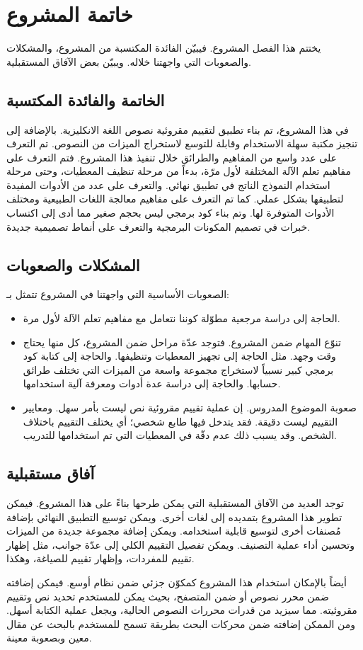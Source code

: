 

\chapter{خاتمة المشروع}
يختتم هذا الفصل المشروع.
فيبيّن الفائدة المكتسبة من المشروع، والمشكلات والصعوبات التي واجهتنا خلاله.
ويبيّن بعض الآفاق المستقبلية.

\section{الخاتمة والفائدة المكتسبة}
في هذا المشروع، تم بناء تطبيق لتقييم مقروئية نصوص اللغة الانكليزية.
بالإضافة إلى تنجيز مكتبة سهلة الاستخدام وقابلة للتوسع لاستخراج الميزات من النصوص.
تم التعرف على عدد واسع من المفاهيم والطرائق خلال تنفيذ هذا المشروع.
فتم التعرف على مفاهيم تعلم الآلة المختلفة لأول مرّة،
بدءاً من مرحلة تنظيف المعطيات، وحتى مرحلة استخدام النموذج الناتج في تطبيق نهائي.
والتعرف على عدد من الأدوات المفيدة لتطبيقها بشكل عملي.
كما تم التعرف على مفاهيم معالجة اللغات الطبيعية ومختلف الأدوات المتوفرة لها.
وتم بناء كود برمجي ليس بحجم صغير مما أدى إلى اكتساب خبرات في تصميم المكونات البرمجية والتعرف على أنماط تصميمية جديدة.



\section{المشكلات والصعوبات}
الصعوبات الأساسية التي واجهتنا في المشروع تتمثل بـ:
\begin{itemize}
	\item 
	الحاجة إلى دراسة مرجعية مطوّلة كوننا نتعامل مع مفاهيم تعلم الآلة لأول مرة.
	\item 
	تنوّع المهام ضمن المشروع.
	فتوجد عدّة مراحل ضمن المشروع، كل منها يحتاج وقت وجهد.
	مثل الحاجة إلى تجهيز المعطيات وتنظيفها.
	والحاجة إلى كتابة كود برمجي كبير نسبياً لاستخراج مجموعة واسعة من الميزات التي تختلف طرائق حسابها.
	والحاجة إلى دراسة عدة أدوات ومعرفة آلية استخدامها.
	\item
	صعوبة الموضوع المدروس.
	إن عملية تقييم مقروئية نص ليست بأمر سهل. ومعايير التقييم ليست دقيقة.
	فقد يتدخل فيها طابع شخصي؛ أي يختلف التقييم باختلاف الشخص.
	وقد يسبب ذلك عدم دقّة في المعطيات التي تم استخدامها للتدريب.
\end{itemize}


\section{آفاق مستقبلية}
توجد العديد من الآفاق المستقبلية التي يمكن طرحها بناءً على هذا المشروع.
فيمكن تطوير هذا المشروع بتمديده إلى لغات أخرى.
ويمكن توسيع التطبيق النهائي بإضافة مُصنفات أخرى لتوسيع قابلية استخدامه.
ويمكن إضافة مجموعة جديدة من الميزات وتحسين أداء عملية التصنيف.
ويمكن تفصيل التقييم الكلي إلى عدّة جوانب، مثل إظهار تقييم للمفردات، وإظهار تقييم للصياغة، وهكذا.

أيضاً بالإمكان استخدام هذا المشروع كمكوّن جزئي ضمن نظام أوسع.
فيمكن إضافته ضمن محرر نصوص أو ضمن المتصفح،
بحيث يمكن للمستخدم تحديد نص وتقييم مقروئيته.
مما سيزيد من قدرات محررات النصوص الحالية، ويجعل عملية الكتابة أسهل.
ومن الممكن إضافته ضمن محركات البحث بطريقة تسمح للمستخدم بالبحث عن مقال معين وبصعوبة معينة.






